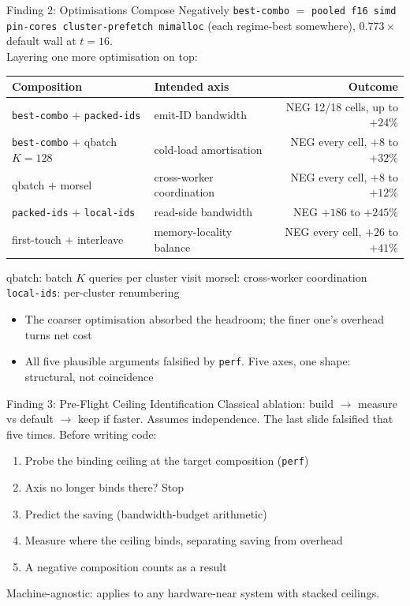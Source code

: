 \documentclass[aspectratio=169,10pt]{beamer}
\newcommand{\bcombo}{\texttt{best-combo}}
\newcommand{\bad}[1]{\textcolor{red!70!black}{#1}}
\begin{document}
\begin{frame}{Finding 2: Optimisations Compose Negatively}
  \bcombo{} $=$ \texttt{pooled f16 simd pin-cores cluster-prefetch mimalloc} (each regime-best somewhere), $0.773\times$ default wall at $t{=}16$.\\
  {\footnotesize Layering one more optimisation on top:}
  \begin{center}
    \footnotesize
    \begin{tabular}{llr}
      \toprule
      Composition & Intended axis & Outcome \\
      \midrule
      \bcombo{} $+$ \texttt{packed-ids} & emit-ID bandwidth & \bad{NEG} 12/18 cells, up to $+24\%$ \\
      \bcombo{} $+$ qbatch $K{=}128$ & cold-load amortisation & \bad{NEG} every cell, $+8$ to $+32\%$ \\
      qbatch $+$ morsel & cross-worker coordination & \bad{NEG} every cell, $+8$ to $+12\%$ \\
      \texttt{packed-ids} $+$ \texttt{local-ids} & read-side bandwidth & \bad{NEG} $+186$ to $+245\%$ \\
      first-touch $+$ interleave & memory-locality balance & \bad{NEG} every cell, $+26$ to $+41\%$ \\
      \bottomrule
    \end{tabular}
  \end{center}
  {\footnotesize qbatch: batch $K$ queries per cluster visit \quad morsel: cross-worker coordination \quad \texttt{local-ids}: per-cluster renumbering}
  \begin{itemize}
    \item The coarser optimisation absorbed the headroom; the finer one's overhead turns net cost
    \item All five plausible arguments falsified by \texttt{perf}. Five axes, one shape: structural, not coincidence
  \end{itemize}
\end{frame}

\begin{frame}{Finding 3: Pre-Flight Ceiling Identification}
  Classical ablation: build $\to$ measure vs default $\to$ keep if faster. Assumes independence. The last slide falsified that five times.
  \vfill
  Before writing code:
  \begin{enumerate}
    \item Probe the binding ceiling at the target composition (\texttt{perf})
    \item Axis no longer binds there? Stop
    \item Predict the saving (bandwidth-budget arithmetic)
    \item Measure where the ceiling binds, separating saving from overhead
    \item A negative composition counts as a result
  \end{enumerate}
  \vfill
  Machine-agnostic: applies to any hardware-near system with stacked ceilings.
\end{frame}
\end{document}

